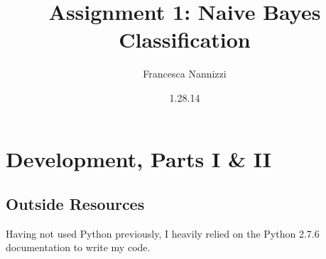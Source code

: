 \documentclass[12pt]{article}
\begin{document}
\title{Assignment 1: Naive Bayes Classification }
\author{Francesca Nannizzi}
\date{1.28.14}
\maketitle

\section{Development, Parts I & II}
\subsection{Outside Resources}
Having not used Python previously, I heavily relied on the Python 2.7.6 documentation to write my code. 
\end{document}
